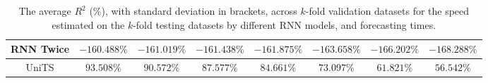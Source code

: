 \begin{table}[!ht]
{\begin{tabular}{|c|c|c|c|c|c|c|c|}
			RNN Twice & $-160.488\%$ & $-161.019\%$ & $-161.438\%$ & $-161.875\%$ & $-163.658\%$ & $-166.202\%$ & $-168.288\%$ \\ \hline
			UniTS & $93.508\%$ & $\mathbf{90.572\%}$ & $\mathbf{87.577\%}$ & $\mathbf{84.661\%}$ & $\mathbf{73.097\%}$ & $\mathbf{61.821\%}$ & $\mathbf{56.542\%}$ \\ \hline
		\end{tabular}
	}
	\caption{The average $R^{2}$ (\%), with standard deviation in brackets, across $k$-fold validation datasets for the speed estimated on the $k$-fold testing datasets by different RNN models, and forecasting times.}
	\label{tab:all_speed_R2}
\end{table}